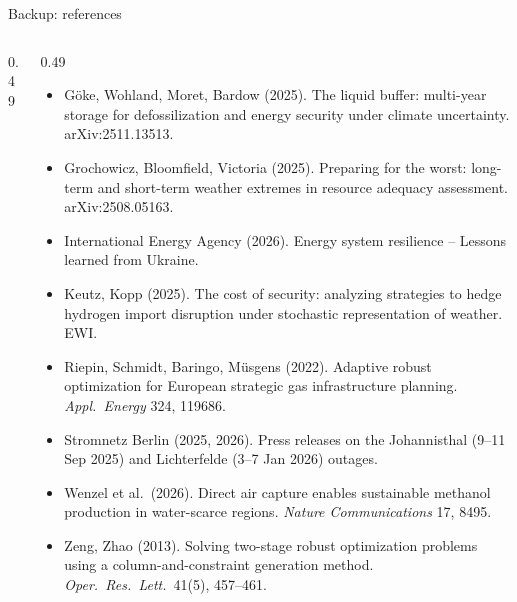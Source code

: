 \documentclass[10pt,aspectratio=169,dvipsnames]{beamer}
\begin{document}
{\begin{frame}{Backup: references}
\begin{columns}[T,onlytextwidth]
\begin{column}{0.49\textwidth}
\begin{itemize}
			\end{itemize}
		\end{column}
		\begin{column}{0.49\textwidth}
			\begin{itemize}\setlength{\itemsep}{0.15em}
				\item Göke, Wohland, Moret, Bardow (2025). The liquid buffer: multi-year storage for
				      defossilization and energy security under climate uncertainty. arXiv:2511.13513.
				\item Grochowicz, Bloomfield, Victoria (2025). Preparing for the worst: long-term and
				      short-term weather extremes in resource adequacy assessment. arXiv:2508.05163.
				\item International Energy Agency (2026). Energy system resilience -- Lessons learned from
				      Ukraine.
				\item Keutz, Kopp (2025). The cost of security: analyzing strategies to hedge hydrogen
				      import disruption under stochastic representation of weather. EWI.
				\item Riepin, Schmidt, Baringo, Müsgens (2022). Adaptive robust optimization for European
				      strategic gas infrastructure planning. \emph{Appl.\ Energy} 324, 119686.
				\item Stromnetz Berlin (2025, 2026). Press releases on the Johannisthal (9--11 Sep 2025)
				      and Lichterfelde (3--7 Jan 2026) outages.
				\item Wenzel et al.\ (2026). Direct air capture enables sustainable methanol production in
				      water-scarce regions. \emph{Nature Communications} 17, 8495.
				\item Zeng, Zhao (2013). Solving two-stage robust optimization problems using a
				      column-and-constraint generation method. \emph{Oper.\ Res.\ Lett.}\ 41(5), 457--461.
			\end{itemize}
		\end{column}
	\end{columns}
\end{frame}}
\end{document}
